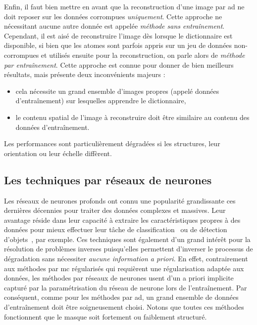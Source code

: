 Enfin, il faut bien mettre en avant que la reconstruction d'une image par \gls{ad} ne doit reposer sur les données corrompues \emph{uniquement}. Cette approche ne nécessitant aucune autre donnée est appelée \emph{méthode sans entraînement}. Cependant, il est aisé de reconstruire l'image dès lorsque le dictionnaire est disponible, si bien que les atomes sont parfois appris sur un jeu de données non-corrompues et utilisés ensuite pour la reconstruction, on parle alors de \emph{méthode par entraînement}. Cette approche est connue pour donner de bien meilleurs résultats, mais présente deux inconvénients majeurs :
\begin{itemize}
    \item cela nécessite un grand ensemble d'images propres (appelé données d'entraînement) sur lesquelles apprendre le dictionnaire,
    \item le contenu spatial de l'image à reconstruire doit être similaire au contenu des données d'entraînement.
\end{itemize}
Les performances sont particulièrement dégradées si les structures, leur orientation ou leur échelle diffèrent.


\subsection{Les techniques par réseaux de neurones}\label{sec-methodes-convnets}

Les réseaux de neurones profonds ont connu une popularité grandissante ces dernières décennies pour traiter des données complexes et massives. Leur avantage réside dans leur capacité à extraire les caractéristiques propres à des données pour mieux effectuer leur tâche de classification~\cite{lecun1989backpropagation} ou de détection d'objets~\cite{szegedy2013deep, zhao2019object}, par exemple. Ces techniques sont également d'un grand intérêt pour la résolution de problèmes inverses puisqu'elles permettent d'inverser le processus de dégradation sans nécessiter \emph{aucune information a priori}. En effet, contrairement aux méthodes par \gls{mc} régularisés qui requièrent une régularisation adaptée aux données, les méthodes par réseaux de neurones usent d'un a priori implicite capturé par la paramétrisation du réseau de neurone lors de l'entraînement. Par conséquent, comme pour les méthodes par \gls{ad}, un grand ensemble de données d'entraînement doit être soigneusement choisi. Notons que toutes ces méthodes fonctionnent que le masque soit fortement ou faiblement structuré.

